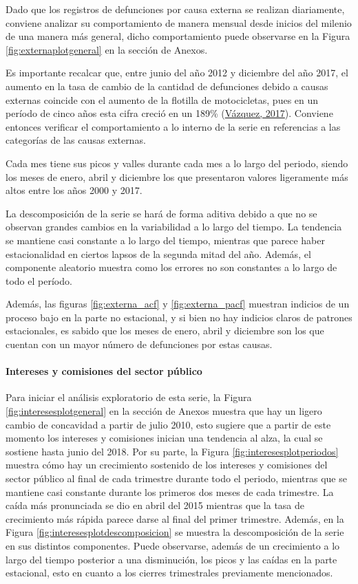 \documentclass[
]{article}
\begin{document}
Dado que los registros de defunciones por causa externa se realizan
diariamente, conviene analizar su comportamiento de manera mensual desde
inicios del milenio de una manera más general, dicho comportamiento
puede observarse en la Figura \ref{fig:externaplotgeneral} en la sección
de Anexos.

Es importante recalcar que, entre junio del año 2012 y diciembre del año
2017, el aumento en la tasa de cambio de la cantidad de defunciones
debido a causas externas coincide con el aumento de la flotilla de
motocicletas, pues en un período de cinco años esta cifra creció en un
189\% (\protect\hyperlink{ref-motos}{Vázquez, 2017}). Conviene entonces
verificar el comportamiento a lo interno de la serie en referencias a
las categorías de las causas externas.

Cada mes tiene sus picos y valles durante cada mes a lo largo del
periodo, siendo los meses de enero, abril y diciembre los que
presentaron valores ligeramente más altos entre los años 2000 y 2017.

La descomposición de la serie se hará de forma aditiva debido a que no
se observan grandes cambios en la variabilidad a lo largo del tiempo. La
tendencia se mantiene casi constante a lo largo del tiempo, mientras que
parece haber estacionalidad en ciertos lapsos de la segunda mitad del
año. Además, el componente aleatorio muestra como los errores no son
constantes a lo largo de todo el período.

Además, las figuras \ref{fig:externa_acf} y \ref{fig:externa_pacf}
muestran indicios de un proceso bajo en la parte no estacional, y si
bien no hay indicios claros de patrones estacionales, es sabido que los
meses de enero, abril y diciembre son los que cuentan con un mayor
número de defunciones por estas causas.

\paragraph{Intereses y comisiones del sector público}

Para iniciar el análisis exploratorio de esta serie, la Figura
\ref{fig:interesesplotgeneral} en la sección de Anexos muestra que hay
un ligero cambio de concavidad a partir de julio 2010, esto sugiere que
a partir de este momento los intereses y comisiones inician una
tendencia al alza, la cual se sostiene hasta junio del 2018. Por su
parte, la Figura \ref{fig:interesesplotperiodos} muestra cómo hay un
crecimiento sostenido de los intereses y comisiones del sector público
al final de cada trimestre durante todo el periodo, mientras que se
mantiene casi constante durante los primeros dos meses de cada
trimestre. La caída más pronunciada se dio en abril del 2015 mientras
que la tasa de crecimiento más rápida parece darse al final del primer
trimestre. Además, en la Figura \ref{fig:interesesplotdescomposicion} se
muestra la descomposición de la serie en sus distintos componentes.
Puede observarse, además de un crecimiento a lo largo del tiempo
posterior a una disminución, los picos y las caídas en la parte
estacional, esto en cuanto a los cierres trimestrales previamente
mencionados.
\end{document}
